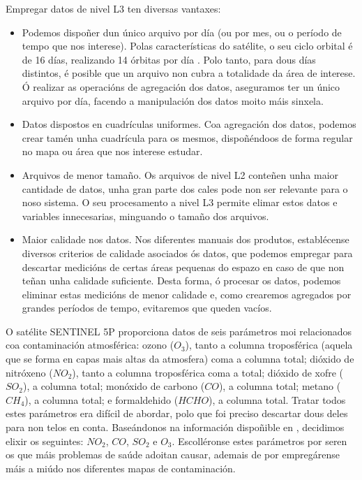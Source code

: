 Empregar datos de nivel L3 ten diversas vantaxes:
\begin{itemize}
    \item Podemos dispoñer dun único arquivo por día (ou por mes, ou o período de tempo que nos interese). Polas características do satélite, o seu ciclo orbital é de 16 días, realizando 14 órbitas
    por día \cite{s5porbit}. Polo tanto, para dous días distintos, é posible que un arquivo non cubra a totalidade da área de interese. Ó realizar as operacións de agregación dos datos, aseguramos
    ter un único arquivo por día, facendo a manipulación dos datos moito máis sinxela.
    \item Datos dispostos en cuadrículas uniformes. Coa agregación dos datos, podemos crear tamén unha cuadrícula para os mesmos, dispoñéndoos de forma regular no mapa ou área que nos interese
    estudar.
    \item Arquivos de menor tamaño. Os arquivos de nivel L2 conteñen unha maior cantidade de datos, unha gran parte dos cales pode non ser relevante para o noso sistema. O seu procesamento a nivel
    L3 permite elimar estos datos e variables innecesarias, minguando o tamaño dos arquivos.
    \item Maior calidade nos datos. Nos diferentes manuais dos produtos, establécense diversos criterios de calidade asociados ós datos, que podemos empregar para descartar medicións de certas
    áreas pequenas do espazo en caso de que non teñan unha calidade suficiente. Desta forma, ó procesar os datos, podemos eliminar estas medicións de menor calidade e, como crearemos agregados por
    grandes períodos de tempo, evitaremos que queden vacíos.
\end{itemize}

O satélite SENTINEL 5P proporciona datos de seis parámetros moi relacionados coa contaminación atmosférica: ozono ($O_3$), tanto a columna troposférica (aquela que se forma en capas mais altas da
atmosfera) coma a columna total; dióxido de nitróxeno ($NO_2$), tanto a columna troposférica coma a total; dióxido de xofre ($SO_2$), a columna total; monóxido de carbono ($CO$), a columna total;
metano ($CH_4$), a columna total; e formaldehido ($HCHO$), a columna total. Tratar todos estes parámetros era difícil de abordar, polo que foi preciso descartar dous deles para non telos en conta.
Baseándonos na información dispoñible en \cite{airpollutants}, decidimos elixir os seguintes: $NO_2$, $CO$, $SO_2$ e $O_3$. Escolléronse estes parámetros por seren os que máis problemas de saúde
adoitan causar, ademais de por empregárense máis a miúdo nos diferentes mapas de contaminación.

